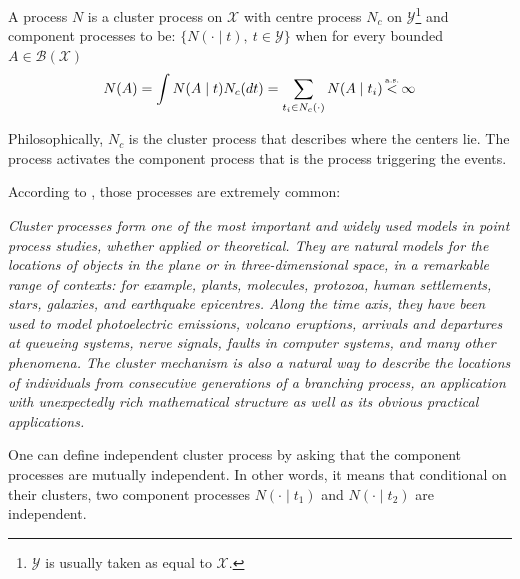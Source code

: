 \begin{definition}
\label{def:cluster_process}
A process $ N$ is a cluster process on $\mathcal X$ with centre process $ N_c $ on $\mathcal Y$\footnote{$\mathcal Y$ is usually taken as equal to $\mathcal X$.} and component processes to be: $\{N( \cdot \mid t ), \ t \in \mathcal Y \}$ when for every bounded $A \in \mathcal B( \mathcal X )$
\begin{equation}
N(A) = \int N(A \mid t  ) N_c (dt) = \sum_{ t_i \in N_c(\cdot) } N(A \mid t_i )  \stackrel{\mathclap{\mbox{\normalfont\tiny a.s.}}}{<} \infty 
\end{equation}

Philosophically, $N_c$ is the cluster process that describes where the centers lie. The process activates the component process that is the process triggering the events.


\end{definition}
According to \cite{daley}, those processes are extremely common:

\textit{Cluster processes form one of the most important and widely used models in point process studies, whether applied or theoretical. They are natural models for the locations of objects in the plane or in three-dimensional space, in a remarkable range of contexts: for example, plants, molecules, protozoa, human settlements, stars, galaxies, and earthquake epicentres. Along the time axis, they have been used to model photoelectric emissions, volcano eruptions, arrivals and departures at queueing systems, nerve signals, faults in computer systems, and many other phenomena. The cluster mechanism is also a natural way to describe the locations of individuals from consecutive generations of a branching process, an application with unexpectedly rich mathematical structure as well as its obvious practical applications.}

\begin{remarque}
One can define independent cluster process by asking that the component processes are mutually independent. In other words, it means that conditional on their clusters, two component processes $N(\cdot \mid t_1)$ and $N(\cdot \mid t_2)$ are independent.
\end{remarque}


